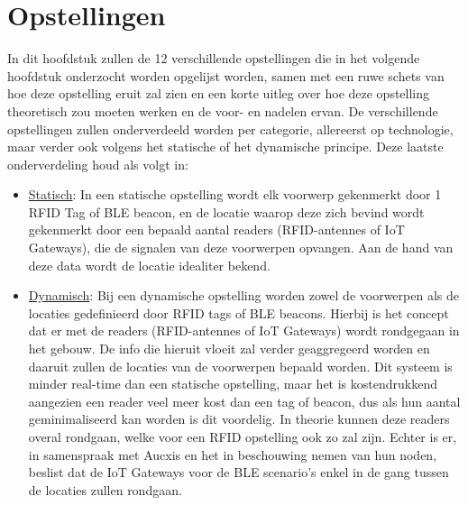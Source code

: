\chapter{Opstellingen}
\label{ch:opstellingen}

In dit hoofdstuk zullen de 12 verschillende opstellingen die in het volgende hoofdstuk onderzocht worden opgelijst worden, samen met een ruwe schets van hoe deze opstelling eruit zal zien en een korte uitleg over hoe deze opstelling theoretisch zou moeten werken en de voor- en nadelen ervan.
De verschillende opstellingen zullen onderverdeeld worden per categorie, allereerst op technologie, maar verder ook volgens het statische of het dynamische principe. 
Deze laatste onderverdeling houd als volgt in:
\begin{itemize}
	\item \underline{Statisch}:
	In een statische opstelling wordt elk voorwerp gekenmerkt door 1 RFID Tag of BLE beacon, en de locatie waarop deze zich bevind wordt gekenmerkt door een bepaald aantal readers (RFID-antennes of IoT Gateways), die de signalen van deze voorwerpen opvangen. Aan de hand van deze data wordt de locatie idealiter bekend.
	\item \underline{Dynamisch}:
	Bij een dynamische opstelling worden zowel de voorwerpen als de locaties gedefinieerd door RFID tags of BLE beacons. Hierbij is het concept dat er met de readers (RFID-antennes of IoT Gateways) wordt rondgegaan in het gebouw. De info die hieruit vloeit zal verder geaggregeerd worden en daaruit zullen de locaties van de voorwerpen bepaald worden. Dit systeem is minder real-time dan een statische opstelling, maar het is kostendrukkend aangezien een reader veel meer kost dan een tag of beacon, dus als hun aantal geminimaliseerd kan worden is dit voordelig.
	In theorie kunnen deze readers overal rondgaan, welke voor een RFID opstelling ook zo zal zijn. Echter is er, in samenspraak met Aucxis en het in beschouwing nemen van hun noden, beslist dat de IoT Gateways voor de BLE scenario's enkel in de gang tussen de locaties zullen rondgaan.
\end{itemize}

